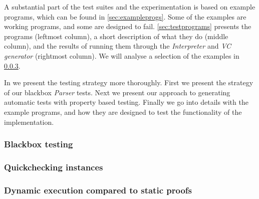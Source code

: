 A substantial part of the test suites and the experimentation is based on example programs, which can be found in \cref{sec:exampleprogs}.
Some of the examples are working programs, and some are designed to fail.
\cref{sec:testprograms} presents the programs (leftmost column), a short description of what they do (middle column), and the results of running them through the \textit{Interpreter} and \textit{VC generator} (rightmost column).
We will analyse a selection of the examples in \cref{sec:examples}.

In  we present the testing strategy more thoroughly.
First we present the strategy of our blackbox \textit{Parser} tests. 
Next we present our approach to generating automatic tests with property based testing. 
Finally we go into details with the example programs, and how they are designed to test the functionality of the implementation.

\subsubsection{Blackbox testing}\label{sec:blackbox}


\subsubsection{Quickchecking instances}\label{sec:qc}


\subsubsection{Dynamic execution compared to static proofs}\label{sec:examples}


